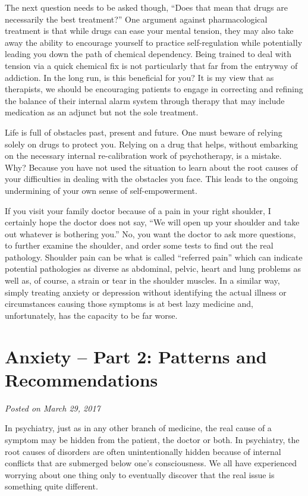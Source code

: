 \documentclass[]{book}
\begin{document}
The next question needs to be asked though, ``Does that mean that drugs are necessarily the best treatment?'' One argument against pharmacological treatment is that while drugs can ease your mental tension, they may also take away the ability to encourage yourself to practice self-regulation while potentially leading you down the path of chemical dependency. Being trained to deal with tension via a quick chemical fix is not particularly that far from the entryway of addiction. In the long run, is this beneficial for you? It is my view that as therapists, we should be encouraging patients to engage in correcting and refining the balance of their internal alarm system through therapy that may include medication as an adjunct but not the sole treatment.

Life is full of obstacles past, present and future. One must beware of relying solely on drugs to protect you. Relying on a drug that helps, without embarking on the necessary internal re-calibration work of psychotherapy, is a mistake. Why? Because you have not used the situation to learn about the root causes of your difficulties in dealing with the obstacles you face. This leads to the ongoing undermining of your own sense of self-empowerment.

If you visit your family doctor because of a pain in your right shoulder, I certainly hope the doctor does not say, ``We will open up your shoulder and take out whatever is bothering you.'' No, you want the doctor to ask more questions, to further examine the shoulder, and order some tests to find out the real pathology. Shoulder pain can be what is called ``referred pain'' which can indicate potential pathologies as diverse as abdominal, pelvic, heart and lung problems as well as, of course, a strain or tear in the shoulder muscles. In a similar way, simply treating anxiety or depression without identifying the actual illness or circumstances causing those symptoms is at best lazy medicine and, unfortunately, has the capacity to be far worse.

\hypertarget{anxiety-part-2-patterns-and-recommendations}{%
\section{Anxiety -- Part 2: Patterns and Recommendations}\label{anxiety-part-2-patterns-and-recommendations}}

\emph{Posted on March 29, 2017}

In psychiatry, just as in any other branch of medicine, the real cause of a symptom may be hidden from the patient, the doctor or both. In psychiatry, the root causes of disorders are often unintentionally hidden because of internal conflicts that are submerged below one's consciousness. We all have experienced worrying about one thing only to eventually discover that the real issue is something quite different.
\end{document}
